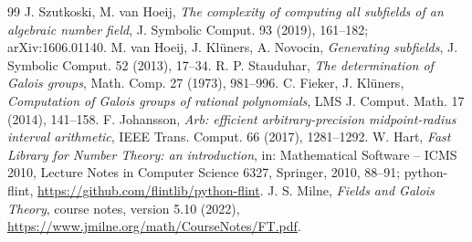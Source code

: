 \documentclass[11pt,a4paper]{article}
\theoremstyle{definition}
\theoremstyle{remark}
\begin{document}
\begin{thebibliography}{99}
 J. Szutkoski, M. van Hoeij, \emph{The complexity of computing all subfields of an
  algebraic number field}, J. Symbolic Comput. 93 (2019), 161--182; arXiv:1606.01140.
 M. van Hoeij, J. Kl\"uners, A. Novocin, \emph{Generating subfields}, J. Symbolic
  Comput. 52 (2013), 17--34.
 R. P. Stauduhar, \emph{The determination of Galois groups}, Math. Comp. 27
  (1973), 981--996.
 C. Fieker, J. Kl\"uners, \emph{Computation of Galois groups of rational polynomials},
  LMS J. Comput. Math. 17 (2014), 141--158.
 F. Johansson, \emph{Arb: efficient arbitrary-precision midpoint-radius interval
  arithmetic}, IEEE Trans. Comput. 66 (2017), 1281--1292.
 W. Hart, \emph{Fast Library for Number Theory: an introduction}, in: Mathematical
  Software -- ICMS 2010, Lecture Notes in Computer Science 6327, Springer, 2010, 88--91;
  python-flint, \url{https://github.com/flintlib/python-flint}.
 J. S. Milne, \emph{Fields and Galois Theory}, course notes, version 5.10 (2022),
  \url{https://www.jmilne.org/math/CourseNotes/FT.pdf}.
\end{thebibliography}
\end{document}
